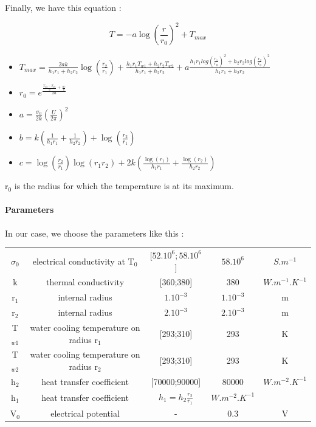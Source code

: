 \documentclass[11pt]{amsart}
\begin{document}
Finally, we have this equation :

\[
T=-a \log(\frac{r}{r_{0}})^{2} + T_{max}
\]



\begin{itemize}

\item $T_{max}=\frac{2ak}{h_{1}r_{1}+h_{2}r_{2}}\log(\frac{r_{2}}{r_{1}})+\frac{h_{1}r_{1}T_{w1}+h_{2}r_{2}T_{w2}}{h_{1}r_{1}+h_{2}r_{2}}+ a\frac{h_{1}r_{1}log(\frac{r_{1}}{r_{0}})^{2} +h_{2}r_{2}log(\frac{r_{2}}{r_{0}})^{2}}{h_{1}r_{1}+h_{2}r_{2}}$

\item $r_{0}=e^{\frac{\frac{T_{w2}-T_{w1}}{b}+\frac{ac}{b}}{2a}}$

\item $a=\frac{\sigma_{0}}{2k}(\frac{U}{2\pi})^{2}$

\item $b=k(\frac{1}{h_{1}r_{1}}+\frac{1}{h_{2}r_{2}})+\log(\frac{r_{2}}{r_{1}})$

\item $c=\log(\frac{r_{2}}{r_{1}})\log(r_{1}r_{2}) + 2k (\frac{\log(r_{1})}{h_{1}r_{1}}+\frac{\log(r_{2})}{h_{2}r_{2}})$

\end{itemize}


r${}_{0}$ is the radius for which the temperature is at its maximum.


\hypertarget{x-parameters}{\paragraph{Parameters}}
In our case, we choose the parameters like this :


\begin{center}
\begin{tabular}{|c|c|c|c|c|}
\hline
$\sigma_{0}$ & electrical conductivity at T${}_{0}$ & $[52.10^{6}; 58.10^{6}$] & $58.10^{6}$ & $S.m^{-1}$ \\ 
k & thermal conductivity & [360;380] & 380 & $W.m^{-1} .K^{-1}$ \\ 
r${}_{1}$ & internal radius & $1.10^{-3}$ & $1.10^{-3}$ & m \\ 
r${}_{2}$ & internal radius & $2.10^{-3}$ & $2.10^{-3}$ & m \\ 
T${}_{w1}$ & water cooling temperature on radius r${}_{1}$ & [293;310] & 293 & K \\ 
T${}_{w2}$ & water cooling temperature on radius r${}_{2}$ & [293;310] & 293 & K \\ 
h${}_{2}$ & heat transfer coefficient & [70000;90000] & 80000 & $W.m^{-2} .K^{-1}$ \\ 
h${}_{1}$ & heat transfer coefficient & $h_{1}=h_{2}\frac{r_{2}}{r_{1}}$ & $W.m^{-2} .K^{-1}$ \\ 
V${}_{0}$ & electrical potential & - & 0.3 & V \\ 
\hline
\end{tabular}
\end{center}
\end{document}

